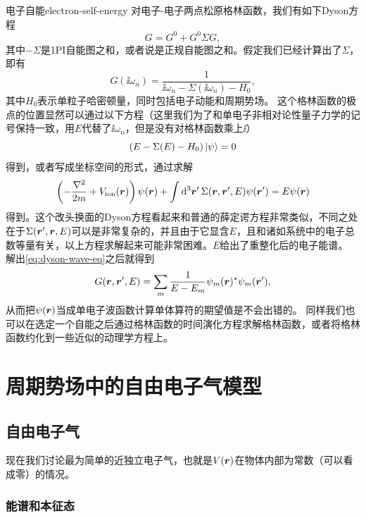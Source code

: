 \begin{back}{电子自能}{electron-self-energy}
    对电子-电子两点松原格林函数，我们有如下Dyson方程
    \begin{equation}
        G  = G^{0} + G^0 \Sigma G,
    \end{equation}
    其中$-\Sigma$是1PI自能图之和，或者说是正规自能图之和。假定我们已经计算出了$\Sigma$，即有
    \[
        G(\ii \omega_n) = \frac{1}{\ii \omega_n - \Sigma(\ii \omega_n) - H_0},
    \]
    其中$H_0$表示单粒子哈密顿量，同时包括电子动能和周期势场。
    这个格林函数的极点的位置显然可以通过以下方程（这里我们为了和单电子非相对论性量子力学的记号保持一致，用$E$代替了$\ii \omega_n$，但是没有对格林函数乘上$\ii$）
    \[
        (E - \Sigma(E) - H_0) \ket{\psi} = 0 
    \]
    得到，或者写成坐标空间的形式，通过求解
    \begin{equation}
        \left( - \frac{\laplacian}{2m} + V_\text{ion}(\vb*{r}) \right) \psi(\vb*{r}) + \int \dd[3]{\vb*{r}'} \Sigma(\vb*{r}, \vb*{r}', E) \psi(\vb*{r}') = E \psi(\vb*{r})
        \label{eq:dyson-wave-eq}
    \end{equation}
    得到。这个改头换面的Dyson方程看起来和普通的薛定谔方程非常类似，不同之处在于$\Sigma(\vb*{r}', \vb*{r}, E)$可以是非常复杂的，并且由于它显含$E$，且和诸如系统中的电子总数等量有关，以上方程求解起来可能非常困难。$E$给出了重整化后的电子能谱。
    解出\eqref{eq:dyson-wave-eq}之后就得到
    \begin{equation}
        G(\vb*{r}, \vb*{r}', E) = \sum_m \frac{1}{E - E_m} \psi_m(\vb*{r})^* \psi_m(\vb*{r}'),
    \end{equation}
    从而把$\psi(\vb*{r})$当成单电子波函数计算单体算符的期望值是不会出错的。
    同样我们也可以在选定一个自能之后通过格林函数的时间演化方程求解格林函数，或者将格林函数约化到一些近似的动理学方程上。
\end{back}

\section{周期势场中的自由电子气模型}

\subsection{自由电子气}

现在我们讨论最为简单的近独立电子气，也就是$V(\vb*{r})$在物体内部为常数（可以看成零）的情况。

\subsubsection{能谱和本征态} 

